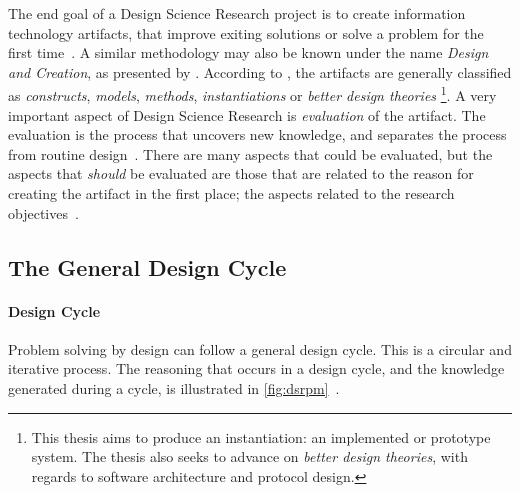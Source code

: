 The end goal of a Design Science Research project is to create information technology \glspl{artifact}, that improve exiting solutions or solve a problem for the first time~\cite[p.~6]{alanhevnerDesignResearchInformation2010}.
A similar methodology may also be known under the name \textit{Design and Creation}, as presented by \textcite[p.~108]{oatesResearchingInformationSystems2006}.
According to \textcite{alanhevnerDesignResearchInformation2010}, the artifacts are generally classified as \textit{constructs}, \textit{models}, \textit{methods}, \textit{instantiations} or \textit{better design theories}%
\label{par:artifact-classes}%
\footnote{This thesis aims to produce an instantiation: an implemented or prototype system. The thesis also seeks to advance on \textit{better design theories}, with regards to software architecture and protocol design.}.
A very important aspect of Design Science Research is \textit{evaluation} of the artifact.
The evaluation is the process that uncovers new knowledge, and separates the process from routine design~\cite[p.~7]{alanhevnerDesignResearchInformation2010}.
There are many aspects that could be evaluated, but the aspects that \textit{should} be evaluated are those that are related to the reason for creating the artifact in the first place; the aspects related to the research objectives~\cite[p.~115]{oatesResearchingInformationSystems2006}.


\subsection{The General Design Cycle }

\paragraph{Design Cycle}
Problem solving by design can follow a general design cycle.
This is a circular and iterative process.
The reasoning that occurs in a design cycle, and the knowledge generated during a cycle, is illustrated in \cref{fig:dsrpm}~\cite[p.~26]{alanhevnerDesignResearchInformation2010}.

